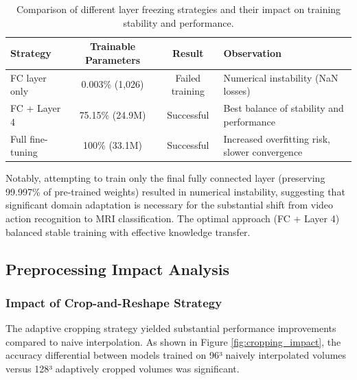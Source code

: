 \documentclass[12pt, a4paper]{article}
\begin{document}
\begin{table}[htbp]
\centering
\begin{tabular}{|l|c|c|p{4cm}|}
\hline
\textbf{Strategy} & \textbf{Trainable Parameters} & \textbf{Result} & \textbf{Observation} \\
\hline
FC layer only & 0.003\% (1,026) & Failed training & Numerical instability (NaN losses) \\
\hline
FC + Layer 4 & 75.15\% (24.9M) & Successful & Best balance of stability and performance \\
\hline
Full fine-tuning & 100\% (33.1M) & Successful & Increased overfitting risk, slower convergence \\
\hline
\end{tabular}
\caption{Comparison of different layer freezing strategies and their impact on training stability and performance.}
\label{tab:freezing_strategies}
\end{table}

Notably, attempting to train only the final fully connected layer (preserving 99.997\% of pre-trained weights) resulted in numerical instability, suggesting that significant domain adaptation is necessary for the substantial shift from video action recognition to MRI classification. The optimal approach (FC + Layer 4) balanced stable training with effective knowledge transfer.

\subsection{Preprocessing Impact Analysis}

\subsubsection{Impact of Crop-and-Reshape Strategy}

The adaptive cropping strategy yielded substantial performance improvements compared to naive interpolation. As shown in Figure \ref{fig:cropping_impact}, the accuracy differential between models trained on 96³ naively interpolated volumes versus 128³ adaptively cropped volumes was significant.
\end{document}
